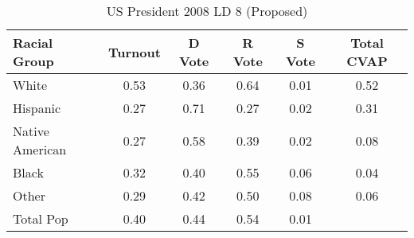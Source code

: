 \begin{table}[htb]
\begin{center}
\caption{US President 2008 LD 8 (Proposed)}
\label{pres08_cvap_ld_8}
\begin{tabular}{lccccc}
  \hline
Racial Group & Turnout & D Vote & R Vote & S Vote & Total CVAP \\ 
  \hline
White & 0.53 & 0.36 & 0.64 & 0.01 & 0.52 \\ 
  Hispanic & 0.27 & 0.71 & 0.27 & 0.02 & 0.31 \\ 
  Native American & 0.27 & 0.58 & 0.39 & 0.02 & 0.08 \\ 
  Black & 0.32 & 0.40 & 0.55 & 0.06 & 0.04 \\ 
  Other & 0.29 & 0.42 & 0.50 & 0.08 & 0.06 \\ 
  Total Pop & 0.40 & 0.44 & 0.54 & 0.01 &  \\ 
   \hline
\end{tabular}
\end{center}
\end{table}
